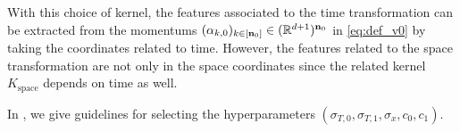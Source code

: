     \begin{remark}
      With this choice of kernel, the features associated to the time transformation can be extracted from the momentums $(\alpha_{k,0})_{k\in[\mathbf{n}_0]}\in (\mathbb{R}^{d+1})^{\mathbf{n}_0}$ in \eqref{eq:def_v0} by taking the coordinates related to time.
      However, the features related to the space transformation are not only in the space coordinates since the related kernel $K_{\text{space}}$ depends on time as well.
     \end{remark}
    In , we give guidelines for selecting the hyperparameters $(\sigma_{T,0},\sigma_{T,1},\sigma_x,c_0,c_1)$.
  
  
    








